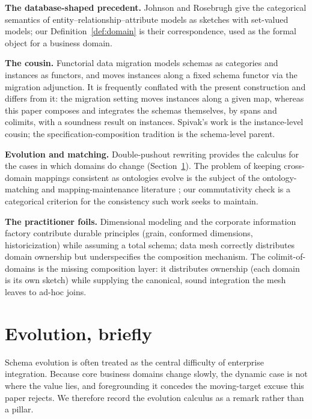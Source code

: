 \documentclass[11pt]{article}
\theoremstyle{plain}
\theoremstyle{definition}
\begin{document}
\textbf{The database-shaped precedent.} Johnson and Rosebrugh \cite{johnson-rosebrugh} give the categorical semantics of entity--relationship--attribute models as sketches with set-valued models; our Definition~\ref{def:domain} is their correspondence, used as the formal object for a business domain.

\textbf{The cousin.} Functorial data migration \cite{spivak2012,spivak2014} models schemas as categories and instances as functors, and moves instances along a fixed schema functor via the migration adjunction. It is frequently conflated with the present construction and differs from it: the migration setting moves instances along a given map, whereas this paper composes and integrates the schemas themselves, by spans and colimits, with a soundness result on instances. Spivak's work is the instance-level cousin; the specification-composition tradition is the schema-level parent.

\textbf{Evolution and matching.} Double-pushout rewriting \cite{ehrig} provides the calculus for the cases in which domains do change (Section~\ref{sec:evolution}). The problem of keeping cross-domain mappings consistent as ontologies evolve is the subject of the ontology-matching and mapping-maintenance literature \cite{euzenat-shvaiko}; our commutativity check is a categorical criterion for the consistency such work seeks to maintain.

\textbf{The practitioner foils.} Dimensional modeling \cite{kimball} and the corporate information factory contribute durable principles (grain, conformed dimensions, historicization) while assuming a total schema; data mesh \cite{dehghani} correctly distributes domain ownership but underspecifies the composition mechanism. The colimit-of-domains is the missing composition layer: it distributes ownership (each domain is its own sketch) while supplying the canonical, sound integration the mesh leaves to ad-hoc joins.

\section{Evolution, briefly}\label{sec:evolution}

Schema evolution is often treated as the central difficulty of enterprise integration. Because core business domains change slowly, the dynamic case is not where the value lies, and foregrounding it concedes the moving-target excuse this paper rejects. We therefore record the evolution calculus as a remark rather than a pillar.
\end{document}
